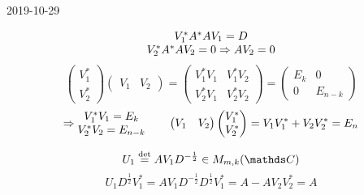 \documentclass[main]{subfiles}
\begin{document}
\begin{lect}{2019-10-29}
\begin{Proof}
\[\begin{matrix}
            V_1^*A^*AV_1 = D\\
            V_2^*A^*AV_2 = 0 \Rightarrow AV_2 = 0
        \end{matrix}\]
        \[\begin{pmatrix}
            V_1^*\\
            V_2^*
        \end{pmatrix} \begin{pmatrix}
        V_1 & V_2
        \end{pmatrix} = \begin{pmatrix}
        V_1^*V_1 & V_1^*V_2\\
        V_2^*V_1 & V_2^*V_2
        \end{pmatrix} = \begin{pmatrix}
        E_k & 0\\
        0 & E_{n - k}
        \end{pmatrix}\]
        \[\Rightarrow \begin{matrix}
            V_1^*V_1 = E_k\\
            V_2^*V_2 = E_{n - k}
        \end{matrix} \qquad \begin{pmatrix}
        V_1 & V_2
        \end{pmatrix} \begin{pmatrix}
            V_1^*\\
            V_2^*
        \end{pmatrix} = V_1V_1^* + V_2V_2^* = E_n\]

        \[U_1 \os{\det}{=} AV_1D^{-\frac{1}{2}} \in M_{m, k}(\CC)  \]
        \[U_1 D^{\frac{1}{2}}V_{1}^* = AV_1D^{-\frac{1}{2}}D^{\frac{1}{2}} V_1^* = A - AV_2V_2^*  = A \]
    \end{Proof}
  \end{lect}
\end{document}
